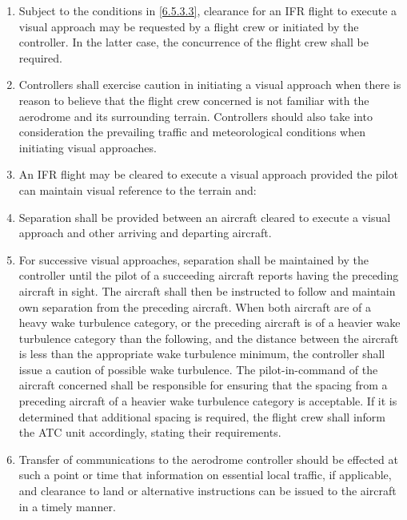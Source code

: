 \begin{enumerate}
    \item Subject to the conditions in \ref{6.5.3.3}, clearance for an IFR flight to execute a visual approach may be requested by a flight crew or initiated by the controller. In the latter case, the concurrence of the flight crew shall be required.
    \item Controllers shall exercise caution in initiating a visual approach when there is reason to believe that the flight crew concerned is not familiar with the aerodrome and its surrounding terrain. Controllers should also take into consideration the prevailing traffic and meteorological conditions when initiating visual approaches.
    \item \label{6.5.3.3} An IFR flight may be cleared to execute a visual approach provided the pilot can maintain visual reference to the terrain and:


    \item Separation shall be provided between an aircraft cleared to execute a visual approach and other arriving and departing aircraft.
    \item For successive visual approaches, separation shall be maintained by the controller until the pilot of a succeeding aircraft reports having the preceding aircraft in sight. The aircraft shall then be instructed to follow and maintain own separation from the preceding aircraft. When both aircraft are of a heavy wake turbulence category, or the preceding aircraft is of a heavier wake turbulence category than the following, and the distance between the aircraft is less than the appropriate wake turbulence minimum, the controller shall issue a caution of possible wake turbulence. The pilot-in-command of the aircraft concerned shall be responsible for ensuring that the spacing from a preceding aircraft of a heavier wake turbulence category is acceptable. If it is determined that additional spacing is required, the flight crew shall inform the ATC unit accordingly, stating their requirements.
    \item Transfer of communications to the aerodrome controller should be effected at such a point or time that information on essential local traffic, if applicable, and clearance to land or alternative instructions can be issued to the aircraft in a timely manner.
\end{enumerate}

